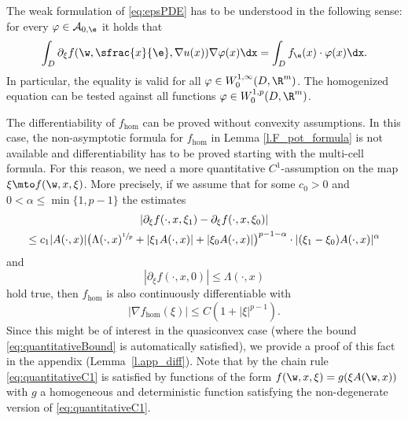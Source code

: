 \begin{remark}\label{r.weaksol}
\begin{enumeratea}
\item
The weak formulation of \eqref{eq:epsPDE} has to be understood in the following sense: for every $\varphi\in\mathcal{A}_{0,\e}$ it holds that
\begin{equation*}
\int_D \partial_{\xi}f(\w,\sfrac{x}{\e},\nabla u(x)) \nabla\varphi(x)\dx=\int_D f_{\e}(x)\cdot\varphi(x)\dx.
\end{equation*}
In particular, the equality is valid for all $\varphi\in W^{1,\infty}_0(D,\R^m)$. The homogenized equation can be tested against all functions $\varphi\in W^{1,p}_0(D,\R^m)$.

\item
The differentiability of $f_{\hom}$ can be proved without convexity assumptions. In this case, the non-asymptotic formula for $f_{\hom}$ in Lemma \ref{l.F_pot_formula} is not available and differentiability has to be proved starting with the multi-cell formula. For this reason, we need a more quantitative $C^1$-assumption on the map $\xi\mto f(\w,x,\xi)$. More precisely, if we assume that for some $c_0>0$ and $0<\alpha\leq\min\{1,p-1\}$ the estimates
\begin{multline}\label{eq:quantitativeC1}
| \partial_{\xi}f(\cdot,x,\xi_1)-\partial_{\xi}f(\cdot,x,\xi_0)|\\
\leq c_1|A(\cdot,x)|\bigl(\Lambda(\cdot,x)^{\sfrac{1}{p}}+|\xi_1A(\cdot,x)|+|\xi_0A(\cdot,x)|\bigr)^{p-1-\alpha}
\cdot|(\xi_1-\xi_0)A(\cdot,x)|^{\alpha}
\end{multline}
and
\begin{equation}\label{eq:quantitativeBound}
|\partial_{\xi}f(\cdot,x,0)|\leq\Lambda(\cdot,x)
\end{equation}
hold true, then $f_{\hom}$ is also continuously differentiable with
\[
|\nabla f_{\hom}(\xi)|\leq C(1+|\xi|^{p-1}).
\]
Since this might be of interest in the quasiconvex case (where the bound \eqref{eq:quantitativeBound} is automatically satisfied), we provide a proof of this fact in the appendix (\cf Lemma~\ref{l.app_diff}). Note that by the chain rule \eqref{eq:quantitativeC1} is satisfied by functions of the form $f(\w,x,\xi)=g(\xi A(\w,x))$ with $g$ a homogeneous and deterministic function satisfying the non-degenerate version of \eqref{eq:quantitativeC1}.


\end{enumeratea}
\end{remark}
